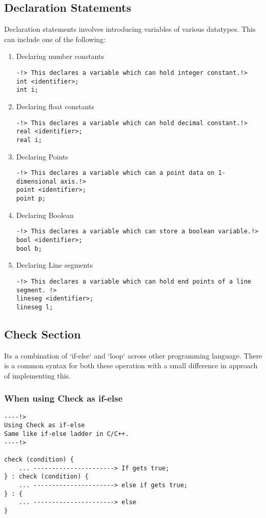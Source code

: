 \documentclass{article}
\begin{document}
\subsection{Declaration Statements}
Declaration statements involves introducing variables of various datatypes. This can include one of the following:
\begin{enumerate}
\item Declaring number constants
\begin{verbatim}
-!> This declares a variable which can hold integer constant.!>
int <identifier>;
int i;
\end{verbatim}

\item Declaring float constants
\begin{verbatim}
-!> This declares a variable which can hold decimal constant.!>
real <identifier>;
real i;
\end{verbatim}

\item Declaring Points
\begin{verbatim}
-!> This declares a variable which can a point data on 1-dimensional axis.!>
point <identifier>;
point p;
\end{verbatim}

\item Declaring Boolean
\begin{verbatim}
-!> This declares a variable which can store a boolean variable.!>
bool <identifier>;
bool b;
\end{verbatim}

\item Declaring Line segments
\begin{verbatim}
-!> This declares a variable which can hold end points of a line segment. !>
lineseg <identifier>;
lineseg l;
\end{verbatim}
\end{enumerate}

\subsection{Check Section}
Its a combination of `if-else` and `loop` across other programming language. There is a common syntax for both these operation with a small difference in approach of implementing this.

\subsubsection{When using Check as if-else}
\begin{verbatim}
----!>
Using Check as if-else
Same like if-else ladder in C/C++.
----!>

check (condition) {
    ... ----------------------> If gets true;
} : check (condition) {
    ... ----------------------> else if gets true;
} : {
    ... ----------------------> else
}
\end{verbatim}
\end{document}
